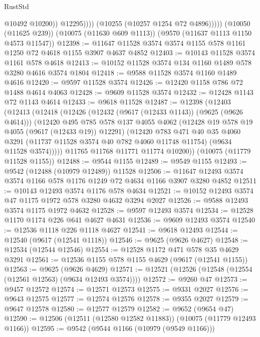 \begin{lexlean}{RustStd}
\begin{coremodule}
{\begin{coremodule}
{{{{{{{{{{{{{{{{{{{{{{{{{{{{{{{{{                      @10492
                      @10200))
                  @12295))))
          (@10255 (@10257 @1254 @72 @4896)))))
    (@10050 (@11625 @239))
    (@10075 (@11630 @609 @1113))
    (@9570 (@11637 @1113 @1150 @4573 @11547))
@12398 := @11647 @11528 @3574 @3574 @1155 @578 @1161 @1250 @72 @4618 @1155 @3907 @4637 @4852
@12403 := @10143 @11528 @3574 @1161 @578 @4618
@12413 := @10152 @11528 @3574 @134 @1160 @1489 @578 @3280 @4616 @3574 @1804
@12418 := @9588 @11528 @3574 @1160 @1489 @4616
@12420 := @9597 @11528 @3574
@12426 := @12420 @1158 @786 @72 @1488 @4614 @4063
@12428 := @9609 @11528 @3574
@12432 := @12428 @1143 @72 @1143 @4614
@12433 := @9618 @11528
@12487 := @12398
    (@12403
      (@12413
        (@12418
          (@12426
            (@12432 (@9617 (@12433 @1143)) (@9625 (@9626 @4614)))
            (@12420
              @495
              @785
              @578
              @137
              @4055
              @4062
              (@12428 @19 @578 @19 @4055 (@9617 (@12433 @19)) @12291)
              (@12420
                @783
                @471
                @40
                @35
                @4060
                @3291
                (@11737 @11528 @3574 @40 @782 @4060 @11748 @11754)
                (@9634 @11528 @3574)))))
        @11765
        @11768
        @11771
        @11774
        @10200))
    (@10075 (@11779 @11528 @1155))
@12488 := @9544 @1155
@12489 := @9549 @1155
@12493 := @9542 (@12488 (@10979 @12489)) @11528
@12506 := @11647 @12493 @3574 @3574 @1166 @578 @1176 @1249 @72 @4634 @1166 @3907 @3280 @4852
@12511 := @10143 @12493 @3574 @1176 @578 @4634
@12521 := @10152 @12493 @3574 @47 @1175 @1972 @578 @3280 @4632 @3294 @2027
@12526 := @9588 @12493 @3574 @1175 @1972 @4632
@12528 := @9597 @12493 @3574
@12534 := @12528 @1170 @1174 @226 @641 @4627 @4631
@12536 := @9609 @12493 @3574
@12540 := @12536 @1118 @226 @1118 @4627
@12541 := @9618 @12493
@12544 := @12540 (@9617 (@12541 @1118))
@12546 := @9625 (@9626 @4627)
@12548 := @12534 (@12544 @12546)
@12554 := @12528 @1172 @471 @578 @35 @4629 @3291
@12561 := @12536 @1155 @578 @1155 @4629 (@9617 (@12541 @1155))
@12563 := @9625 (@9626 @4629)
@12571 := @12521 (@12526 (@12548 (@12554 (@12561 @12563) (@9634 @12493 @3574))))
@12572 := @9260 @47
@12573 := @9457 @12572
@12574 := @12571 @12573
@12575 := @9331 @2027
@12576 := @9643 @12575
@12577 := @12574 @12576
@12578 := @9355 @2027
@12579 := @9647 @12578
@12580 := @12577 @12579
@12582 := @9652 (@9654 @47)
@12590 := @12506 (@12511 (@12580 @12582 @11883)) (@10075 (@11779 @12493 @1166))
@12595 := @9542 (@9544 @1166 (@10979 (@9549 @1166)))
}}}}}}}}}}}}}}}}}}}}}}}}}}}}}}}}}
\end{coremodule}}
\end{coremodule}
\end{lexlean}
